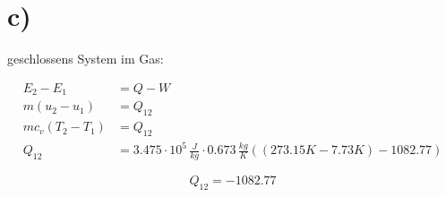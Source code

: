 

\section*{c)}
geschlossens System im Gas:

\begin{align*}
E_2 - E_1 &= Q - W \\
m (u_2 - u_1) &= Q_{12} \\
m c_v (T_2 - T_1) &= Q_{12} \\
Q_{12} &= 3.475 \cdot 10^5 \, \frac{J}{kg} \cdot 0.673 \, \frac{kg}{K} \left( (273.15 K - 7.73 K) - 1082.77 \right)
\end{align*}

\[
\boxed{Q_{12} = -1082.77}
\]
